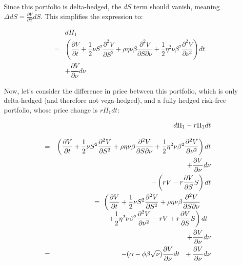\documentclass[uplatex,a4j,12pt,dvipdfmx]{jsarticle}
\begin{document}
Since this portfolio is delta-hedged, the $dS$ term should vanish, meaning $ \Delta dS = \frac{\partial V}{\partial S} dS $. This simplifies the expression to:

\begin{eqnarray*}
	&&
	d\Pi_{1}
	\\[3mm] &=&
	\left(
	\dfrac{\partial V}{\partial t}
	+
	\dfrac{1}{2}
	\nu S^{2}
	\dfrac{\partial^{2} V}{\partial S^{2}}
	+
	\rho \eta \nu \beta
	\dfrac{\partial^{2} V}{\partial S \partial \nu}
	+
	\dfrac{1}{2}
	\eta^{2} \nu \beta^{2}
	\dfrac{\partial^{2} V}{\partial \nu^{2}}
	\right)dt
	\\ &&
	+
	\dfrac{\partial V}{\partial \nu} d \nu
\end{eqnarray*}

Now, let's consider the difference in price between this portfolio, which is only delta-hedged (and therefore not vega-hedged), and a fully hedged risk-free portfolio, whose price change is $r \Pi_{1} dt$:

\begin{eqnarray*}
	&&
	d\Pi_{1} - r \Pi_{1} dt
	\\[3mm] &=&
	\left(
	\dfrac{\partial V}{\partial t}
	+
	\dfrac{1}{2}
	\nu S^{2}
	\dfrac{\partial^{2} V}{\partial S^{2}}
	+
	\rho \eta \nu \beta
	\dfrac{\partial^{2} V}{\partial S \partial \nu}
	+
	\dfrac{1}{2}
	\eta^{2} \nu \beta^{2}
	\dfrac{\partial^{2} V}{\partial \nu^{2}}
	\right)dt
	\\ &&
	+
	\dfrac{\partial V}{\partial \nu} d \nu
	\\ && -
	\left(
	rV
	-
	r
	\dfrac{\partial V}{\partial S} S
	\right)
	dt
	\\ &&
	\begin{array}{l}
		\hspace{-7mm}
		= \
		\left(
		\dfrac{\partial V}{\partial t}
		+
		\dfrac{1}{2}
		\nu S^{2}
		\dfrac{\partial^{2} V}{\partial S^{2}}
		+
		\rho \eta \nu \beta
		\dfrac{\partial^{2} V}{\partial S \partial \nu}
		\right.
		\\
		\left.
		+
		\dfrac{1}{2}
		\eta^{2} \nu \beta^{2}
		\dfrac{\partial^{2} V}{\partial \nu^{2}}
		-
		rV
		+
		r
		\dfrac{\partial V}{\partial S} S
		\right)dt
	\end{array}
	\\ &&
	+
	\dfrac{\partial V}{\partial \nu} d \nu
	\\ &=&
	-
	( \alpha - \phi \beta \sqrt{\nu} )
	\dfrac{\partial V}{\partial \nu}
	dt
	\ \
	+
	\dfrac{\partial V}{\partial \nu} d \nu
\end{eqnarray*}
\end{document}
